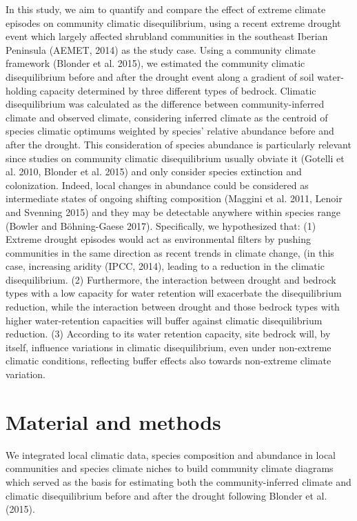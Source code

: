 \documentclass[11pt,twoside]{reedthesis}
\begin{document}
In this study, we aim to quantify and compare the effect of extreme
climate episodes on community climatic disequilibrium, using a recent
extreme drought event which largely affected shrubland communities in
the southeast Iberian Peninsula (AEMET, 2014) as the study case. Using a
community climate framework (Blonder et al. 2015), we estimated the
community climatic disequilibrium before and after the drought event
along a gradient of soil water-holding capacity determined by three
different types of bedrock. Climatic disequilibrium was calculated as
the difference between community-inferred climate and observed climate,
considering inferred climate as the centroid of species climatic
optimums weighted by species' relative abundance before and after the
drought. This consideration of species abundance is particularly
relevant since studies on community climatic disequilibrium usually
obviate it (Gotelli et al. 2010, Blonder et al. 2015) and only consider
species extinction and colonization. Indeed, local changes in abundance
could be considered as intermediate states of ongoing shifting
composition (Maggini et al. 2011, Lenoir and Svenning 2015) and they may
be detectable anywhere within species range (Bowler and Böhning-Gaese
2017). Specifically, we hypothesized that: (1) Extreme drought episodes
would act as environmental filters by pushing communities in the same
direction as recent trends in climate change, (in this case, increasing
aridity (IPCC, 2014), leading to a reduction in the climatic
disequilibrium. (2) Furthermore, the interaction between drought and
bedrock types with a low capacity for water retention will exacerbate
the disequilibrium reduction, while the interaction between drought and
those bedrock types with higher water-retention capacities will buffer
against climatic disequilibrium reduction. (3) According to its water
retention capacity, site bedrock will, by itself, influence variations
in climatic disequilibrium, even under non-extreme climatic conditions,
reflecting buffer effects also towards non-extreme climate
variation.\par

\section{Material and methods}\label{material-and-methods-3}

We integrated local climatic data, species composition and abundance in
local communities and species climate niches to build community climate
diagrams which served as the basis for estimating both the
community-inferred climate and climatic disequilibrium before and after
the drought following Blonder et al. (2015).\par
\end{document}
